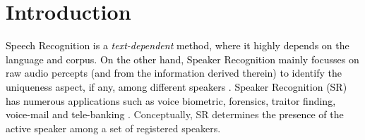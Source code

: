 \documentclass{article}
\begin{document}
\section{\textbf{{Introduction}}}
\label{Intro}
\textcolor{black}{Speech Recognition is a \textit{text-dependent} method, where it highly depends on the language and corpus. On the other hand, Speaker Recognition mainly focusses on raw audio percepts (and from the information derived therein) %
to identify the uniqueness aspect, if any, among different speakers \cite{1}. Speaker Recognition (SR) has numerous applications such as voice biometric, forensics, traitor finding, voice-mail and  tele-banking \cite{2}}. Conceptually, SR determines \textcolor{black}{the presence of the active speaker} among a set of registered speakers. %
\end{document}
